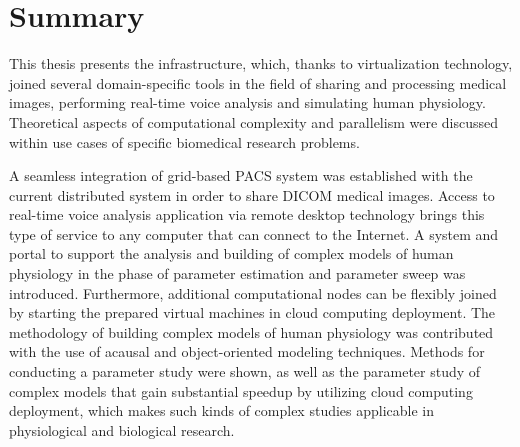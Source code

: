 

\section{Summary}

This thesis presents the infrastructure, which, thanks to virtualization technology, joined several domain-specific tools in the field of sharing and processing medical images, performing real-time voice analysis and simulating human physiology. Theoretical aspects of computational complexity and parallelism were discussed within use cases of specific biomedical research problems.  

A seamless integration of grid-based PACS system was established with the current distributed system in order to share DICOM medical images. Access to real-time voice analysis application via remote desktop technology brings this type of service to any computer that can connect to the Internet. A system and portal to support the analysis and building of complex models of human physiology in the phase of parameter estimation and parameter sweep was introduced. Furthermore, additional computational nodes can be flexibly joined by starting the prepared virtual machines in cloud computing deployment. The methodology of building complex models of human physiology was contributed with the use of acausal and object-oriented modeling techniques. Methods for conducting a parameter study were shown, as well as the parameter study of complex models that gain substantial speedup by utilizing cloud computing deployment, which makes such kinds of complex studies applicable in physiological and biological research.
